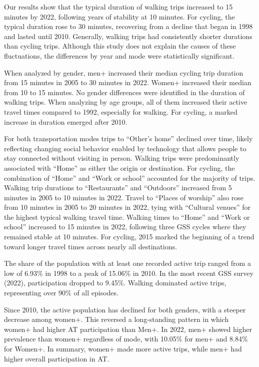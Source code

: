 \documentclass[preprint, 3p,
authoryear]{elsarticle} %
\begin{document}
Our results show that the typical duration of walking trips increased to
15 minutes by 2022, following years of stability at 10 minutes. For
cycling, the typical duration rose to 30 minutes, recovering from a
decline that began in 1998 and lasted until 2010. Generally, walking
trips had consistently shorter durations than cycling trips. Although
this study does not explain the causes of these fluctuations, the
differences by year and mode were statistically significant.

When analyzed by gender, men+ increased their median cycling trip
duration from 15 minutes in 2005 to 30 minutes in 2022. Women+ increased
their median from 10 to 15 minutes. No gender differences were
identified in the duration of walking trips. When analyzing by age
groups, all of them increased their active travel times compared to
1992, especially for walking. For cycling, a marked increase in duration
emerged after 2010.

For both transportation modes trips to ``Other's home'' declined over
time, likely reflecting changing social behavior enabled by technology
that allows people to stay connected without visiting in person. Walking
trips were predominantly associated with ``Home'' as either the origin
or destination. For cycling, the combination of ``Home'' and ``Work or
school'' accounted for the majority of trips. Walking trip durations to
``Restaurants'' and ``Outdoors'' increased from 5 minutes in 2005 to 10
minutes in 2022. Travel to ``Places of worship'' also rose from 10
minutes in 2005 to 20 minutes in 2022, tying with ``Cultural venues''
for the highest typical walking travel time. Walking times to ``Home''
and ``Work or school'' increased to 15 minutes in 2022, following three
GSS cycles where they remained stable at 10 minutes. For cycling, 2015
marked the beginning of a trend toward longer travel times across nearly
all destinations.

The share of the population with at least one recorded active trip
ranged from a low of 6.93\% in 1998 to a peak of 15.06\% in 2010. In the
most recent GSS survey (2022), participation dropped to 9.45\%. Walking
dominated active trips, representing over 90\% of all episodes.

Since 2010, the active population has declined for both genders, with a
steeper decrease among women+. This reversed a long-standing pattern in
which women+ had higher AT participation than Men+. In 2022, men+ showed
higher prevalence than women+ regardless of mode, with 10.05\% for men+
and 8.84\% for Women+. In summary, women+ made more active trips, while
men+ had higher overall participation in AT.
\end{document}
